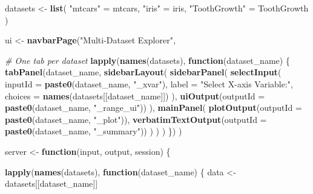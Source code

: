 \documentclass[
]{article}
\newenvironment{Shaded}{\begin{snugshade}}{\end{snugshade}}
\newcommand{\AttributeTok}[1]{\textcolor[rgb]{0.13,0.29,0.53}{#1}}
\newcommand{\CommentTok}[1]{\textcolor[rgb]{0.56,0.35,0.01}{\textit{#1}}}
\newcommand{\ControlFlowTok}[1]{\textcolor[rgb]{0.13,0.29,0.53}{\textbf{#1}}}
\newcommand{\FunctionTok}[1]{\textcolor[rgb]{0.13,0.29,0.53}{\textbf{#1}}}
\newcommand{\NormalTok}[1]{#1}
\newcommand{\OtherTok}[1]{\textcolor[rgb]{0.56,0.35,0.01}{#1}}
\newcommand{\StringTok}[1]{\textcolor[rgb]{0.31,0.60,0.02}{#1}}
\begin{document}
\begin{Shaded}
\begin{Highlighting}[]
\NormalTok{datasets }\OtherTok{\textless{}{-}} \FunctionTok{list}\NormalTok{(}
  \StringTok{"mtcars"} \OtherTok{=}\NormalTok{ mtcars,}
  \StringTok{"iris"} \OtherTok{=}\NormalTok{ iris,}
  \StringTok{"ToothGrowth"} \OtherTok{=}\NormalTok{ ToothGrowth}
\NormalTok{)}

\NormalTok{ui }\OtherTok{\textless{}{-}} \FunctionTok{navbarPage}\NormalTok{(}\StringTok{"Multi{-}Dataset Explorer"}\NormalTok{,}
                 
  \CommentTok{\# One tab per dataset}
  \FunctionTok{lapply}\NormalTok{(}\FunctionTok{names}\NormalTok{(datasets), }\ControlFlowTok{function}\NormalTok{(dataset\_name) \{}
    \FunctionTok{tabPanel}\NormalTok{(dataset\_name,}
      \FunctionTok{sidebarLayout}\NormalTok{(}
        \FunctionTok{sidebarPanel}\NormalTok{(}
          \FunctionTok{selectInput}\NormalTok{(}
            \AttributeTok{inputId =} \FunctionTok{paste0}\NormalTok{(dataset\_name, }\StringTok{"\_xvar"}\NormalTok{),}
            \AttributeTok{label =} \StringTok{"Select X{-}axis Variable:"}\NormalTok{,}
            \AttributeTok{choices =} \FunctionTok{names}\NormalTok{(datasets[[dataset\_name]])}
\NormalTok{          ),}
          \FunctionTok{uiOutput}\NormalTok{(}\AttributeTok{outputId =} \FunctionTok{paste0}\NormalTok{(dataset\_name, }\StringTok{"\_range\_ui"}\NormalTok{))}
\NormalTok{        ),}
        \FunctionTok{mainPanel}\NormalTok{(}
          \FunctionTok{plotOutput}\NormalTok{(}\AttributeTok{outputId =} \FunctionTok{paste0}\NormalTok{(dataset\_name, }\StringTok{"\_plot"}\NormalTok{)),}
          \FunctionTok{verbatimTextOutput}\NormalTok{(}\AttributeTok{outputId =} \FunctionTok{paste0}\NormalTok{(dataset\_name, }\StringTok{"\_summary"}\NormalTok{))}
\NormalTok{        )}
\NormalTok{      )}
\NormalTok{    )}
\NormalTok{  \})}
\NormalTok{)}

\NormalTok{server }\OtherTok{\textless{}{-}} \ControlFlowTok{function}\NormalTok{(input, output, session) \{}
  
  \FunctionTok{lapply}\NormalTok{(}\FunctionTok{names}\NormalTok{(datasets), }\ControlFlowTok{function}\NormalTok{(dataset\_name) \{}
\NormalTok{    data }\OtherTok{\textless{}{-}}\NormalTok{ datasets[[dataset\_name]]}
    

\end{Highlighting}
\end{Shaded}
\end{document}
